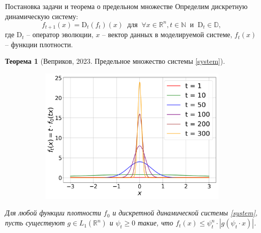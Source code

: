\documentclass{beamer}
\newtheorem{theorem_rus}{Теорема}
\begin{document}
\begin{frame}{Постановка задачи и теорема о предельном множестве}
\vspace{-2mm}
 Определим дискретную динамическую систему:
    \begin{equation}
        \label{system}
        f_{t+1}(x) = \text{D}_t(f_t)(x) ~ \text{ для } ~ \forall x \in \mathbb{R}^n, t \in \mathbb{N} ~\text{ и } ~ \text{D}_t \in \mathbb{D},
    \end{equation}
    где $\text{D}_t$ -- оператор эволюции, $x$ -- вектор данных в моделируемой системе, $f_t(x)$ -- функции плотности.  
    \begin{theorem_rus}[Веприков, 2023. Предельное множество системы \eqref{system}] \label{delta}
        \begin{figure}
        \vspace{-0.61cm}
        \hspace{-6mm}
        \begin{minipage}{0.45\textwidth}
        \vspace{-0.57cm}
        \begin{figure}
        \includegraphics[width=1.22\textwidth]{fig/fig1_Normal.png}
    
        \end{figure}
        \end{minipage}
    \end{figure}
        Для любой функции плотности $f_0$ и дискретной динамической системы \eqref{system}, пусть существуют $ g \in L_1\left(\mathbb{R}^n\right)$ и $\psi_t \geq 0$ такие, что \color{blue}$f_t\left(x\right) \leq \psi_t^n \cdot |g(\psi_t \cdot x)|$. %
    

\end{theorem_rus}
\end{frame}
\end{document}
